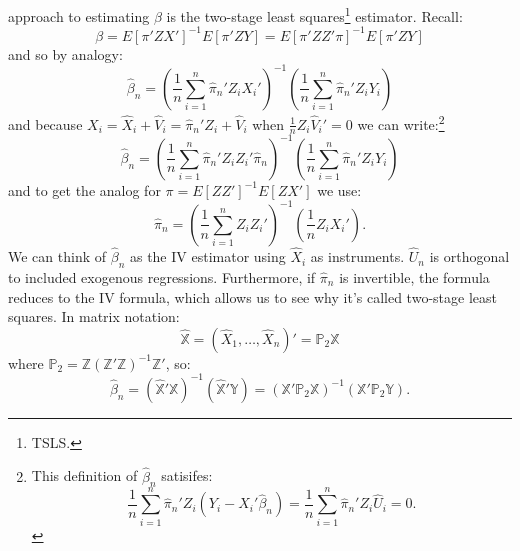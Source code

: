 \documentclass{tufte-book}
\theoremstyle{mytheoremstyle}
\theoremstyle{mylemstyle}
\theoremstyle{mydefstyle}
\begin{document}
 approach to estimating \(\beta\) is the two-stage least squares\footnote{TSLS.} estimator. Recall:
	\[\beta = E[\pi'ZX']^{-1}E[\pi'ZY] = E[\pi'ZZ'\pi]^{-1} E[\pi'ZY]\]
and so by analogy:
	\[\hat{\beta}_n = \left(\frac{1}{n} \sum_{i=1}^n \hat{\pi}_n' Z_i X_i'\right)^{-1}\left(\frac{1}{n} \sum_{i=1}^n \hat{\pi}_n'Z_i Y_i  \right)\]
and because \(X_i = \hat{X}_i + \hat{V}_i = \hat{\pi}_n'Z_i + \hat{V}_i\) when \(\frac{1}{n} Z_i \hat{V}_i' = 0\) we can write:\footnote{This definition of \(\hat{\beta}_n\) satisifes:
	\[\frac{1}{n} \sum_{i=1}^n \hat{\pi}_n'Z_i(Y_i - X_i'\hat{\beta}_n) = \frac{1}{n} \sum_{i=1}^n \hat{\pi}_n'Z_i\hat{U}_i = 0 \text{.}\]}
	\[\hat{\beta}_n = \left(\frac{1}{n} \sum_{i=1}^n \hat{\pi}_n' Z_i Z_i' \hat{\pi}_n \right)^{-1}\left(\frac{1}{n} \sum_{i=1}^n \hat{\pi}_n'Z_i Y_i  \right)\]
and to get the analog for \(\pi = E[ZZ']^{-1}E[ZX']\) we use:
	\[\hat{\pi}_n = \left(\frac{1}{n} \sum_{i=1}^n Z_i Z_i'\right)^{-1}\left(\frac{1}{n} Z_i X_i'\right) \text{.}\]
We can think of \(\hat{\beta}_n\) as the IV estimator using \(\hat{X}_i\) as instruments. \(\hat{U}_n\) is orthogonal to included exogenous regressions. Furthermore, if \(\hat{\pi}_n\) is invertible, the formula reduces to the IV formula, which allows us to see why it's called two-stage least squares. In matrix notation:
	\[\hat{\mathbb{X}} = (\hat{X}_1, \dots, \hat{X}_n)' = \mathbb{P}_2\mathbb{X}\]
where \(\mathbb{P}_2 = \mathbb{Z}(\mathbb{Z}'\mathbb{Z})^{-1}\mathbb{Z}'\), so:
	\[\hat{\beta}_n = (\hat{\mathbb{X}}'\mathbb{X})^{-1}(\hat{\mathbb{X}}'\mathbb{Y}) = (\mathbb{X}'\mathbb{P}_2\mathbb{X})^{-1}(\mathbb{X}'\mathbb{P}_2\mathbb{Y}) \text{.}\]
\end{document}
